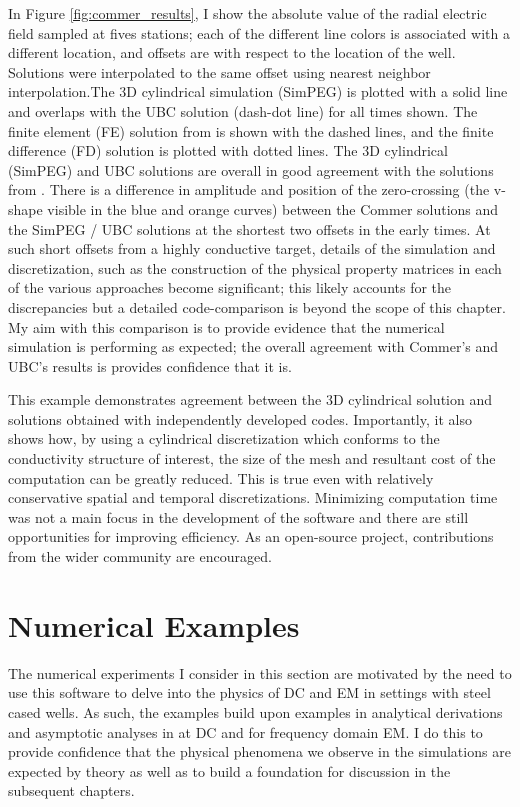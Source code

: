In Figure \ref{fig:commer_results}, I show the absolute value of the radial electric field sampled at fives stations; each of the different line colors is associated with a different location, and offsets are with respect to the location of the well. Solutions were interpolated to the same offset using nearest neighbor interpolation.The 3D cylindrical simulation (SimPEG) is plotted with a solid line and overlaps with the UBC solution (dash-dot line) for all times shown. The finite element (FE) solution from \cite{Commer2015} is shown with the dashed lines, and the finite difference (FD) solution is plotted with dotted lines. The 3D cylindrical (SimPEG) and UBC solutions are overall in good agreement with the solutions from \cite{Commer2015}. There is a difference in amplitude and position of the zero-crossing (the v-shape visible in the blue and orange curves) between the Commer solutions and the SimPEG / UBC solutions at the shortest two offsets in the early times. At such short offsets from a highly conductive target, details of the simulation and discretization, such as the construction of the physical property matrices in each of the various approaches become significant; this likely accounts for the discrepancies but a detailed code-comparison is beyond the scope of this chapter. My aim with this comparison is to provide evidence that the numerical simulation is performing as expected; the overall agreement with Commer’s and UBC’s results is provides confidence that it is.




This example demonstrates agreement between the 3D cylindrical solution and solutions obtained with independently developed codes. Importantly, it also shows how, by using a cylindrical discretization which conforms to the conductivity structure of interest, the size of the mesh and resultant cost of the computation can be greatly reduced. This is true even with relatively conservative spatial and temporal discretizations. Minimizing computation time was not a main focus in the development of the software and there are still opportunities for improving efficiency. As an open-source project, contributions from the wider community are encouraged.
\section{Numerical Examples}
\label{sec:numerical_examples}

The numerical experiments I consider in this section are motivated by the need to use this software to delve into the physics of DC and EM in settings with steel cased wells. As such, the examples build upon examples in analytical derivations and asymptotic analyses in \cite{Kaufman1990, Kaufman1993} at DC and \cite{Augustin1989} for frequency domain EM. I do this to provide confidence that the physical phenomena we observe in the simulations are expected by theory as well as to build a foundation for discussion in the subsequent chapters.
